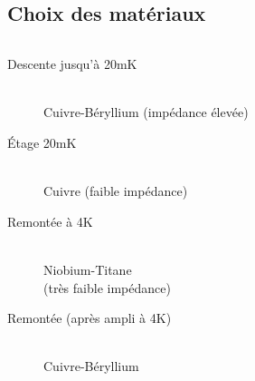 \documentclass[10pt,a9paper,handout]{beamer} \usepackage[utf8]{inputenc} \usepackage[francais]{babel} \usepackage[T1]{fontenc}
\begin{document}
\subsection{Choix des matériaux}
\begin{frame}
\begin{columns}
\begin{column}{0.7\textwidth}
    \begin{description}
        \item[Descente jusqu'à 20mK]~\\
            Cuivre-Béryllium (impédance élevée)
        \item[Étage 20mK]~\\
            Cuivre (faible impédance)
        \item[Remontée à 4K]~\\
            Niobium-Titane \\(très faible impédance)
        \item[Remontée (après ampli à 4K)]~\\
            Cuivre-Béryllium
    \end{description}
\end{column}
\begin{column}{0.3\textwidth}
\begin{figure}[h]
    \begin{center}

\end{center}
\end{figure}
\end{column}
\end{columns}
\end{frame}
\end{document}
